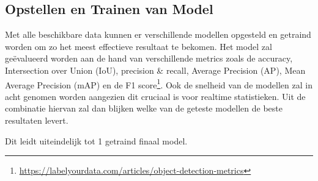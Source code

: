 
\subsection{Opstellen en Trainen van Model}
Met alle beschikbare data kunnen er verschillende modellen opgesteld en getraind worden om zo het meest effectieve resultaat te bekomen. Het model zal geëvalueerd worden aan de hand van verschillende metrics zoals de accuracy, \\Intersection over Union (IoU), precision \& recall, Average Precision (AP), Mean Average Precision (mAP) en de F1 score\footnote{\url{https://labelyourdata.com/articles/object-detection-metrics}}. Ook de snelheid van de modellen zal in acht genomen worden aangezien dit cruciaal is voor realtime statistieken. Uit de combinatie hiervan zal dan blijken welke van de geteste modellen de beste resultaten levert. 

Dit leidt uiteindelijk tot 1 getraind finaal model.




